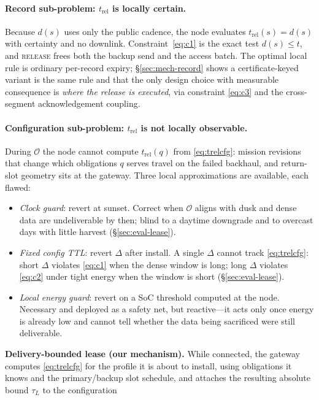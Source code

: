 \documentclass[11pt]{article}
\newcommand{\trel}{t_{\mathrm{rel}}}
\begin{document}
\paragraph{Record sub-problem: $\trel$ is locally certain.}
Because $d(s)$ uses only the public cadence, the node evaluates $\trel(s)=d(s)$ with certainty and
no downlink. Constraint~\eqref{eq:c1} is the exact test $d(s)\le t$, and \textsc{release} frees
both the backup send and the access batch. The optimal local rule is ordinary per-record expiry;
\S\ref{sec:mech-record} shows a certificate-keyed variant is the same rule and that the only design
choice with measurable consequence is \emph{where the release is executed}, via constraint
\eqref{eq:c3} and the cross-segment acknowledgement coupling.

\paragraph{Configuration sub-problem: $\trel$ is not locally observable.}
During $\mathcal O$ the node cannot compute $\trel(q)$ from \eqref{eq:trelcfg}: mission revisions
that change which obligations $q$ serves travel on the failed backhaul, and return-slot geometry
sits at the gateway. Three local approximations are available, each flawed:
\begin{itemize}[leftmargin=*,itemsep=1pt,nosep]
\item \emph{Clock guard}: revert at sunset. Correct when $\mathcal O$ aligns with dusk and dense
data are undeliverable by then; blind to a daytime downgrade and to overcast days with little
harvest (\S\ref{sec:eval-lease}).
\item \emph{Fixed config TTL}: revert $\Delta$ after install. A single $\Delta$ cannot track
\eqref{eq:trelcfg}: short $\Delta$ violates \eqref{eq:c1} when the dense window is long; long
$\Delta$ violates \eqref{eq:c2} under tight energy when the window is short (\S\ref{sec:eval-lease}).
\item \emph{Local energy guard}: revert on a SoC threshold computed at the node. Necessary and
deployed as a safety net, but reactive---it acts only once energy is already low and cannot tell
whether the data being sacrificed were still deliverable.
\end{itemize}
\textbf{Delivery-bounded lease (our mechanism).} While connected, the gateway computes
\eqref{eq:trelcfg} for the profile it is about to install, using obligations it knows and the
primary/backup slot schedule, and attaches the resulting absolute bound $\tau_L$ to the configuration
\end{document}
